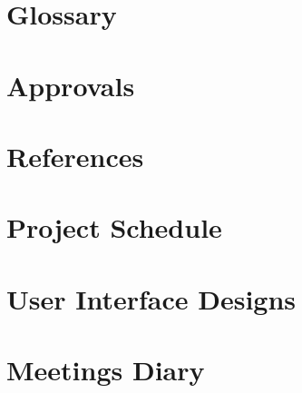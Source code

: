 \documentclass[letter,12pt]{report}
\begin{document}
\chapter{Glossary}

\chapter{Approvals}

\chapter{References}

\appendix
\chapter{Project Schedule}
\chapter{User Interface Designs}
\chapter{Meetings Diary}
\end{document}
